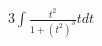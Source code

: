 \documentclass[preview]{standalone}
\begin{document}
\begin{align*}
3 \int \frac{t^2}{1+(t^2)^3} tdt
\end{align*}
\end{document}
